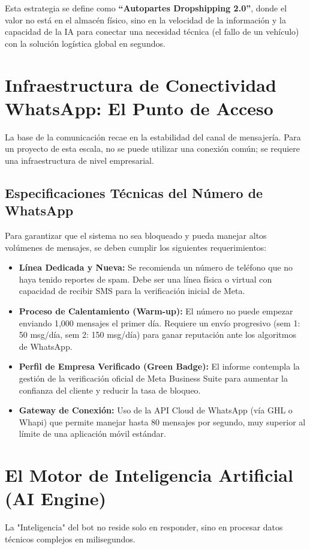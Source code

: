 \documentclass[12pt,a4paper]{article}
\begin{document}
Esta estrategia se define como \textbf{``Autopartes Dropshipping 2.0''}, donde el valor no est\'a en el almacén físico, sino en la velocidad de la información y la capacidad de la IA para conectar una necesidad t\'ecnica (el fallo de un vehículo) con la solución log\'istica global en segundos.

\section{Infraestructura de Conectividad WhatsApp: El Punto de Acceso}
La base de la comunicación recae en la estabilidad del canal de mensajería. Para un proyecto de esta escala, no se puede utilizar una conexión común; se requiere una infraestructura de nivel empresarial.

\subsection{Especificaciones Técnicas del Número de WhatsApp}
Para garantizar que el sistema no sea bloqueado y pueda manejar altos volúmenes de mensajes, se deben cumplir los siguientes requerimientos:
\begin{itemize}
    \item \textbf{Línea Dedicada y Nueva:} Se recomienda un número de teléfono que no haya tenido reportes de spam. Debe ser una línea física o virtual con capacidad de recibir SMS para la verificación inicial de Meta.
    \item \textbf{Proceso de Calentamiento (Warm-up):} El número no puede empezar enviando 1,000 mensajes el primer día. Requiere un envío progresivo (sem 1: 50 msg/día, sem 2: 150 msg/día) para ganar reputación ante los algoritmos de WhatsApp.
    \item \textbf{Perfil de Empresa Verificado (Green Badge):} El informe contempla la gesti\'on de la verificación oficial de Meta Business Suite para aumentar la confianza del cliente y reducir la tasa de bloqueo.
    \item \textbf{Gateway de Conexión:} Uso de la API Cloud de WhatsApp (vía GHL o Whapi) que permite manejar hasta 80 mensajes por segundo, muy superior al límite de una aplicación móvil est\'andar.
\end{itemize}

\section{El Motor de Inteligencia Artificial (AI Engine)}
La "Inteligencia" del bot no reside solo en responder, sino en procesar datos t\'ecnicos complejos en milisegundos.
\end{document}
